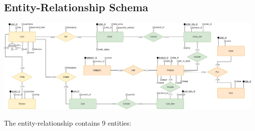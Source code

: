 \subsection{Entity-Relationship Schema}

\includegraphics[width=\columnwidth]{images/wave_er.png}

\noindent The entity-relationship contains 9 entities:

    
